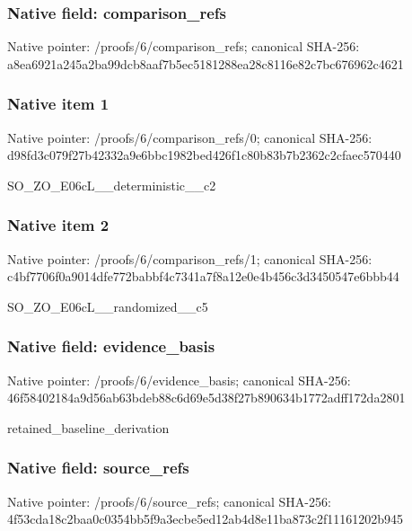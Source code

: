 \documentclass[10pt,a4paper]{article}
\begin{document}
\subsubsection{Native field: comparison\_refs}


Native pointer: /proofs/6/comparison\_refs; canonical SHA-256: a8ea6921a245a2ba99dcb8aa\allowbreak{}f7b5ec5181288ea28c8116e8\allowbreak{}2c7bc676962c4621



\subsubsection{Native item 1}


Native pointer: /proofs/6/comparison\_refs/0; canonical SHA-256: d98fd3c079f27b42332a9e6b\allowbreak{}bc1982bed426f1c80b83b7b2\allowbreak{}362c2cfaec570440


SO\_ZO\_E06cL\_\_deterministic\_\_c2


\subsubsection{Native item 2}


Native pointer: /proofs/6/comparison\_refs/1; canonical SHA-256: c4bf7706f0a9014dfe772bab\allowbreak{}bf4c7341a7f8a12e0e4b456c\allowbreak{}3d3450547e6bbb44


SO\_ZO\_E06cL\_\_randomized\_\_c5


\subsubsection{Native field: evidence\_basis}


Native pointer: /proofs/6/evidence\_basis; canonical SHA-256: 46f58402184a9d56ab63bdeb\allowbreak{}88c6d69e5d38f27b890634b1\allowbreak{}772adff172da2801


retained\_baseline\_derivation


\subsubsection{Native field: source\_refs}


Native pointer: /proofs/6/source\_refs; canonical SHA-256: 4f53cda18c2baa0c0354bb5f\allowbreak{}9a3ecbe5ed12ab4d8e11ba87\allowbreak{}3c2f11161202b945
\end{document}
